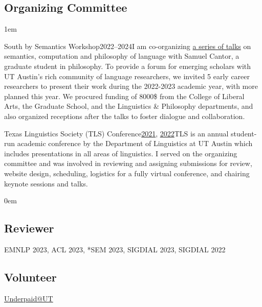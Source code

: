 \subsection{Organizing Committee}

\leftskip1em\relax

\smallentry
  {\large South by Semantics Workshop}{2022--2024}{I am co-organizing \href{https://sites.utexas.edu/sxsemantics/}{a series of talks} on semantics, computation and philosophy of language with Samuel Cantor, a graduate student in philosophy. To provide a forum for emerging scholars with UT Austin's rich community of language researchers, we invited 5 early career researchers to present their work during the 2022-2023 academic year, with more planned this year. We procured funding of 8000\$ from the College of Liberal Arts, the Graduate School, and the Linguistics \& Philosophy departments, and also  organized receptions after the talks to foster dialogue and collaboration.}
  
\smallentry
    {\large Texas Linguistics Society (TLS) Conference}{\href{http://tls.ling.utexas.edu/2021/}{2021}, \href{http://tls.ling.utexas.edu/2022/}{2022}}{TLS is an annual student-run academic conference by the Department of Linguistics at UT Austin which includes presentations in all areas of linguistics. I served on the organizing committee and was involved in reviewing and assigning submissions for review, website design, scheduling, logistics for a fully virtual conference, and chairing keynote sessions and talks.}

\leftskip0em\relax

\subsection{Reviewer}

\quad EMNLP 2023, ACL 2023, *SEM 2023, SIGDIAL 2023, SIGDIAL 2022

\subsection{Volunteer}

\quad \href{http://underpaidatut.org}{Underpaid\makeatletter @\makeatother UT}
